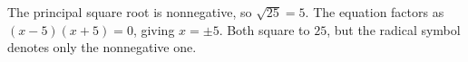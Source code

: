 The principal square root is nonnegative, so $\boxed{\sqrt{25}=5}$. The equation factors as $(x-5)(x+5)=0$, giving $\boxed{x=\pm5}$. Both square to $25$, but the radical symbol denotes only the nonnegative one.
